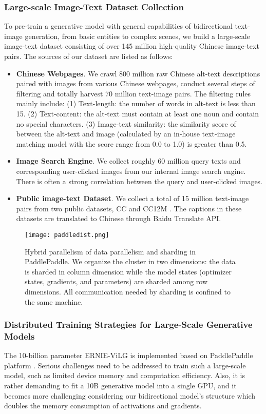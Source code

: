 \documentclass{article}
\begin{document}
\subsubsection{Large-scale Image-Text Dataset Collection}
To pre-train a generative model with general capabilities of bidirectional text-image generation, from basic entities to complex scenes, we build a large-scale image-text dataset consisting of over 145 million high-quality Chinese image-text pairs. The sources of our dataset are listed as follows: 
\begin{itemize}
\item \textbf{Chinese Webpages}. We crawl 800 million raw Chinese alt-text descriptions paired with images from various Chinese webpages, conduct several steps of filtering and totally harvest 70 million text-image pairs. The filtering rules mainly include: (1) Text-length: the number of words in alt-text is less than 15. (2) Text-content: the alt-text must contain at least one noun and contain no special characters. (3) Image-text similarity: the similarity score of between the alt-text and image (calculated by an in-house text-image matching model with the score range from 0.0 to 1.0) is greater than 0.5.
\item \textbf{Image Search Engine}. We collect roughly 60 million query texts and corresponding user-clicked images from our internal image search engine. There is often a strong correlation between the query and user-clicked images.
\item \textbf{Public image-text Dataset}. We collect a total of 15 million text-image pairs from two public datasets, CC \cite{sharma2018conceptual} and CC12M \cite{changpinyo2021conceptual}. The captions in these datasets are translated to Chinese through Baidu Translate API. \end{itemize}

\begin{figure}[htb]
  \centering
  \texttt{[image: paddledist.png]}
  \caption{Hybrid parallelism of data parallelism and sharding in PaddlePaddle. We organize the cluster in two dimensions: the data is sharded in column dimension while the model states (optimizer states, gradients, and parameters) are sharded among row dimensions. All communication needed by sharding is confined to the same machine.}
  \label{fig:paddledist}
\end{figure}


\subsubsection{Distributed Training Strategies for Large-Scale Generative Models}
The 10-billion parameter ERNIE-ViLG is implemented based on PaddlePaddle platform \cite{ma2019paddle}. Serious challenges need to be addressed to train such a large-scale model, such as limited device memory and computation efficiency. Also, it is rather demanding to fit a 10B generative model into a single GPU, and it becomes more challenging considering our bidirectional model’s structure which doubles the memory consumption of activations and gradients. 
\end{document}

